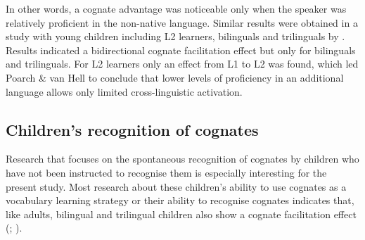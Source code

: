 \documentclass[output=paper,modfonts,nonflat,newtxmath]{langsci/langscibook}
\begin{document}
{In other words, a cognate advantage was noticeable only when the speaker was relatively proficient in the non-native language. Similar results were obtained in a study with young children including L2 learners, bilinguals and trilinguals by \citet{PoarchvanHell2012}. Results indicated a bidirectional cognate facilitation effect but only for bilinguals and trilinguals. For L2 learners only an effect from L1 to L2 was found, which led Poarch \& van Hell to conclude that lower levels of proficiency in an additional language allows only limited cross-linguistic activation.}


\subsection{Children’s recognition of cognates}

Research that focuses on the spontaneous recognition of cognates by children who have not been instructed to recognise them is especially interesting for the present study. Most research about these children’s ability to use cognates as a vocabulary learning strategy or their ability to recognise cognates indicates that, like adults, bilingual and trilingual children also show a cognate facilitation effect (\citealt{PoarchvanHell2012}; \citealt{PotapovaEtAl2016}).
\end{document}
